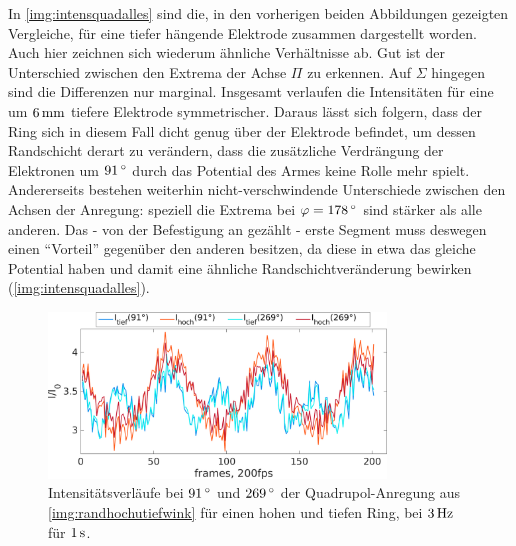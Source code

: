 \documentclass[numbers=noenddot,a4paper]{scrartcl}
\newcommand{\degree}{^\circ}
\begin{document}
					In \ref{img:intensquadalles} sind die, in den vorherigen beiden Abbildungen gezeigten Vergleiche, für eine tiefer hängende Elektrode zusammen dargestellt worden. Auch hier zeichnen sich wiederum ähnliche Verhältnisse ab. Gut ist der Unterschied zwischen den Extrema der Achse $\Pi$ zu erkennen. Auf $\Sigma$ hingegen sind die Differenzen nur marginal. Insgesamt verlaufen die Intensitäten für eine um $\unit[6]{mm}$ tiefere Elektrode symmetrischer. Daraus lässt sich folgern, dass der Ring sich in diesem Fall dicht genug über der Elektrode befindet, um dessen Randschicht derart zu verändern, dass die zusätzliche Verdrängung der Elektronen um $\unit[91]{\degree}$ durch das Potential des Armes keine Rolle mehr spielt. Andererseits bestehen weiterhin nicht-verschwindende Unterschiede zwischen den Achsen der Anregung: speziell die Extrema bei $\varphi=\unit[178]{\degree}$ sind stärker als alle anderen. Das - von der Befestigung an gezählt -  erste Segment muss deswegen einen "`Vorteil"' gegenüber den anderen besitzen, da diese in etwa das gleiche Potential haben und damit eine ähnliche Randschichtveränderung bewirken (\ref{img:intensquadalles}).

						\begin{figure}[!b]
							\centering
							\includegraphics[width=0.8\textwidth,height=0.45\textwidth]{figs/auswertung/intens270u90hochutiefquad3Hz1sek.png}
							\caption{Intensitätsverläufe bei $\unit[91]{\degree}$ und $\unit[269]{\degree}$ der Quadrupol-Anregung aus \ref{img:randhochutiefwink} für einen hohen und tiefen Ring, bei $\unit[3]{Hz}$ für $\unit[1]{s}$. }
							\label{img:intensquadhochutief}
						\end{figure}
\end{document}
